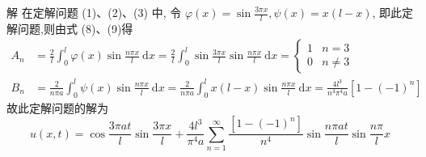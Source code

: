 解 在定解问题 (1)、(2)、(3) 中, 令 $ \varphi(x)=\sin \frac{3 \pi x}{l}, \psi(x)=x(l-x) $, 即此定解问题,则由式 (8)、(9)得
$$
\begin{aligned}
A_{n} & =\frac{2}{l} \int_{0}^{l} \varphi(x) \sin \frac{n \pi x}{l} \mathrm{~d} x=\frac{2}{l} \int_{0}^{l} \sin \frac{3 \pi x}{l} \sin \frac{n \pi x}{l} \mathrm{~d} x  =\left\{\begin{array}{ll}
1 & n=3 \\
0 & n \neq 3
\end{array}\right. \\
B_{n} & =\frac{2}{n \pi a} \int_{0}^{l} \psi(x) \sin \frac{n \pi x}{l} \mathrm{~d} x=\frac{2}{n \pi a} \int_{0}^{l} x(l-x) \sin \frac{n \pi x}{l} \mathrm{~d} x =\frac{4 l^{3}}{n^{4} \pi^{4} a}\left[1-(-1)^{n}\right]
\end{aligned}
$$
故此定解问题的解为
$$
u(x, t)=\cos \frac{3 \pi a t}{l} \sin \frac{3 \pi x}{l}+\frac{4 l^{3}}{\pi^{4} a} \sum_{n=1}^{\infty} \frac{\left[1-(-1)^{n}\right]}{n^{4}} \sin \frac{n \pi a t}{l} \sin \frac{n \pi}{l} x
$$


